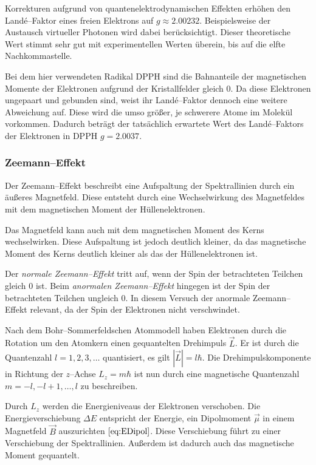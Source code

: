 \documentclass[12pt,a4paper]{scrartcl}
\numberwithin{equation}{section} %
\begin{document}
Korrekturen aufgrund von quantenelektrodynamischen Effekten erhöhen den Landé--Faktor eines freien Elektrons auf $g \approx 2.00232$. Beispielsweise der Austausch virtueller Photonen wird dabei berücksichtigt. Dieser theoretische Wert stimmt sehr gut mit experimentellen Werten überein, bis auf die elfte Nachkommastelle.

Bei dem hier verwendeten Radikal $\mathrm{DPPH}$  sind die Bahnanteile der magnetischen Momente der Elektronen aufgrund der Kristallfelder gleich $0$. Da diese Elektronen ungepaart und gebunden sind, weist ihr Landé--Faktor dennoch eine weitere Abweichung auf. Diese wird die umso größer, je schwerere Atome im Molekül vorkommen. Dadurch beträgt der tatsächlich erwartete Wert des Landé--Faktors der Elektronen in $\mathrm{DPPH}$ $g = 2.0037$.

\hypertarget{zeemanneffekt}{\subsubsection{Zeemann--Effekt}\label{zeemanneffekt}}

Der Zeemann--Effekt beschreibt eine Aufspaltung der Spektrallinien durch ein äußeres Magnetfeld. Diese entsteht durch eine Wechselwirkung des Magnetfeldes mit dem magnetischen Moment der Hüllenelektronen.

Das Magnetfeld kann auch mit dem magnetischen Moment des Kerns wechselwirken. Diese Aufspaltung ist jedoch deutlich kleiner, da das magnetische Moment des Kerns deutlich kleiner als das der Hüllenelektronen ist.

Der \emph{normale Zeemann--Effekt} tritt auf, wenn der Spin der betrachteten Teilchen gleich $0$ ist. Beim \emph{anormalen Zeemann--Effekt} hingegen ist der Spin der betrachteten Teilchen ungleich $0$. In diesem Versuch der anormale Zeemann--Effekt relevant, da der Spin der Elektronen nicht verschwindet.

Nach dem Bohr--Sommerfeldschen Atommodell haben Elektronen durch die Rotation um den Atomkern einen gequantelten Drehimpuls $\vec{L}$. Er ist durch die Quantenzahl $l=1,2,3,\dots$ quantisiert, es gilt $|\vec{L}| = l\hbar$. Die Drehimpulskomponente in Richtung der $z$--Achse $L_z=m\hbar$ ist nun durch eine magnetische Quantenzahl $m=-l,-l+1,\dots,l$ zu beschreiben.

Durch $L_z$ werden die Energieniveaus der Elektronen verschoben. Die Energieverschiebung $\Delta E$ entspricht der Energie, ein Dipolmoment $\vec \mu$ in einem Magnetfeld $\vec B$ auszurichten $\eqref{eq:EDipol}$. Diese Verschiebung führt zu einer Verschiebung der Spektrallinien. Außerdem ist dadurch auch das magnetische Moment gequantelt.
\end{document}
